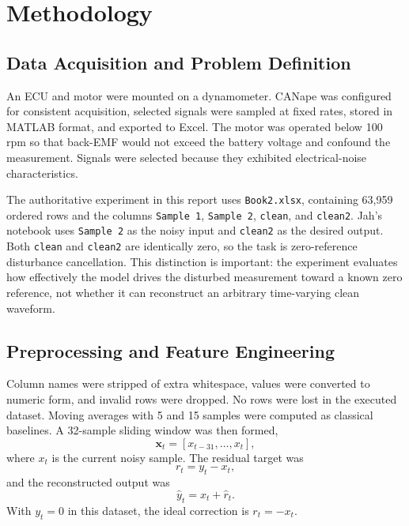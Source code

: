 \documentclass[conference]{IEEEtran}
\begin{document}
\section{Methodology}
\subsection{Data Acquisition and Problem Definition}
An ECU and motor were mounted on a dynamometer. CANape was configured for consistent acquisition, selected signals were sampled at fixed rates, stored in MATLAB format, and exported to Excel. The motor was operated below 100 rpm so that back-EMF would not exceed the battery voltage and confound the measurement. Signals were selected because they exhibited electrical-noise characteristics.

The authoritative experiment in this report uses \texttt{Book2.xlsx}, containing 63,959 ordered rows and the columns \texttt{Sample 1}, \texttt{Sample 2}, \texttt{clean}, and \texttt{clean2}. Jah's notebook uses \texttt{Sample 2} as the noisy input and \texttt{clean2} as the desired output. Both \texttt{clean} and \texttt{clean2} are identically zero, so the task is zero-reference disturbance cancellation. This distinction is important: the experiment evaluates how effectively the model drives the disturbed measurement toward a known zero reference, not whether it can reconstruct an arbitrary time-varying clean waveform.

\subsection{Preprocessing and Feature Engineering}
Column names were stripped of extra whitespace, values were converted to numeric form, and invalid rows were dropped. No rows were lost in the executed dataset. Moving averages with 5 and 15 samples were computed as classical baselines. A 32-sample sliding window was then formed,
\begin{equation}
\mathbf{x}_t=[x_{t-31},\ldots,x_t],
\end{equation}
where $x_t$ is the current noisy sample. The residual target was
\begin{equation}
r_t=y_t-x_t,
\end{equation}
and the reconstructed output was
\begin{equation}
\hat{y}_t=x_t+\hat{r}_t.
\end{equation}
With $y_t=0$ in this dataset, the ideal correction is $r_t=-x_t$.
\end{document}
